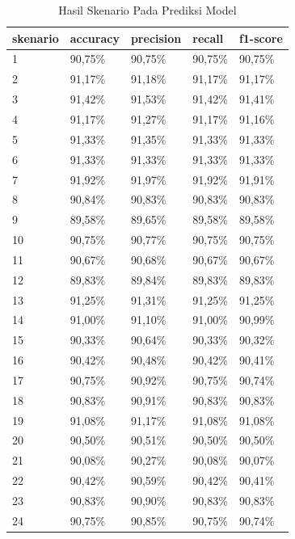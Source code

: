 \begin{longtable}[c]{|l|l|l|l|l|}
  \caption{Hasil Skenario Pada Prediksi Model}
  \label{tab:result_testing_scenario}                  \\
  \hline
  skenario & accuracy & precision & recall  & f1-score \\ \hline
  \endhead
  1        & 90,75\%  & 90,75\%   & 90,75\% & 90,75\%  \\ \hline
  2        & 91,17\%  & 91,18\%   & 91,17\% & 91,17\%  \\ \hline
  3        & 91,42\%  & 91,53\%   & 91,42\% & 91,41\%  \\ \hline
  4        & 91,17\%  & 91,27\%   & 91,17\% & 91,16\%  \\ \hline
  5        & 91,33\%  & 91,35\%   & 91,33\% & 91,33\%  \\ \hline
  6        & 91,33\%  & 91,33\%   & 91,33\% & 91,33\%  \\ \hline
  7        & 91,92\%  & 91,97\%   & 91,92\% & 91,91\%  \\ \hline
  8        & 90,84\%  & 90,83\%   & 90,83\% & 90,83\%  \\ \hline
  9        & 89,58\%  & 89,65\%   & 89,58\% & 89,58\%  \\ \hline
  10       & 90,75\%  & 90,77\%   & 90,75\% & 90,75\%  \\ \hline
  11       & 90,67\%  & 90,68\%   & 90,67\% & 90,67\%  \\ \hline
  12       & 89,83\%  & 89,84\%   & 89,83\% & 89,83\%  \\ \hline
  13       & 91,25\%  & 91,31\%   & 91,25\% & 91,25\%  \\ \hline
  14       & 91,00\%  & 91,10\%   & 91,00\% & 90,99\%  \\ \hline
  15       & 90,33\%  & 90,64\%   & 90,33\% & 90,32\%  \\ \hline
  16       & 90,42\%  & 90,48\%   & 90,42\% & 90,41\%  \\ \hline
  17       & 90,75\%  & 90,92\%   & 90,75\% & 90,74\%  \\ \hline
  18       & 90,83\%  & 90,91\%   & 90,83\% & 90,83\%  \\ \hline
  19       & 91,08\%  & 91,17\%   & 91,08\% & 91,08\%  \\ \hline
  20       & 90,50\%  & 90,51\%   & 90,50\% & 90,50\%  \\ \hline
  21       & 90,08\%  & 90,27\%   & 90,08\% & 90,07\%  \\ \hline
  22       & 90,42\%  & 90,59\%   & 90,42\% & 90,41\%  \\ \hline
  23       & 90,83\%  & 90,90\%   & 90,83\% & 90,83\%  \\ \hline
  24       & 90,75\%  & 90,85\%   & 90,75\% & 90,74\%  \\ \hline
\end{longtable}

